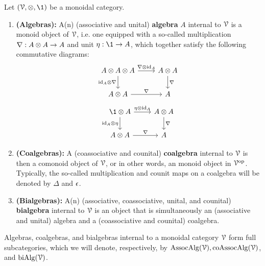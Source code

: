             \begin{definition} \label{def: algebras_coalgebras_and_bialgebras} 
                Let $(\calV, \tensor, \1)$ be a monoidal category. 
                    \begin{enumerate}
                        \item \textbf{(Algebras):} A(n) (associative and unital) \textbf{algebra} $A$ internal to $\mathcal{V}$ is a monoid object of $\mathcal{V}$, i.e. one equipped with a so-called multiplication $\nabla: A \tensor A \to A$ and unit $\eta: \1 \to A$, which together satisfy the following commutative diagrams:
                            $$
                                \begin{tikzcd}
                                	{A \tensor A \tensor A} & {A \tensor A} \\
                                	{A \tensor A} & {A}
                                	\arrow["{\id_A \tensor \nabla}"', from=1-1, to=2-1]
                                	\arrow["{\nabla}", from=2-1, to=2-2]
                                	\arrow["{\nabla \tensor \id_A}", from=1-1, to=1-2]
                                	\arrow["{\nabla}", from=1-2, to=2-2]
                                \end{tikzcd}
                            $$
                            $$
                                \begin{tikzcd}
                                	{\1 \tensor A} & {A \tensor A} \\
                                	{A \tensor A} & {A}
                                	\arrow["{\nabla}", from=1-2, to=2-2]
                                	\arrow["{\nabla}", from=2-1, to=2-2]
                                	\arrow["{\id_A \tensor \eta}"', from=1-1, to=2-1]
                                	\arrow["{\eta \tensor \id_A}", from=1-1, to=1-2]
                                \end{tikzcd}
                            $$
                        \item \textbf{(Coalgebras):} A (coassociative and counital) \textbf{coalgebra} internal to $\mathcal{V}$ is then a comonoid object of $\mathcal{V}$, or in other words, an monoid object in $\mathcal{V}^{\mathrm{op}}$. Typically, the so-called multiplication and counit maps on a coalgebra will be denoted by $\Delta$ and $\epsilon$.
                        \item \textbf{(Bialgebras):} A(n) (associative, coassociative, unital, and counital) \textbf{bialgebra} internal to $\mathcal{V}$ is an object that is simultaneously an (associative and unital) algebra and a (coassociative and counital) coalgebra.
                    \end{enumerate}
                Algebras, coalgebras, and bialgebras internal to a monoidal category $\mathcal{V}$ form full subcategories, which we will denote, respectively, by $\mathrm{Assoc}\mathrm{Alg}(\mathcal{V}), \mathrm{co}\mathrm{Assoc}\mathrm{Alg}(\mathcal{V})$, and $\mathrm{bi}\mathrm{Alg}(\mathcal{V})$.
            \end{definition}
